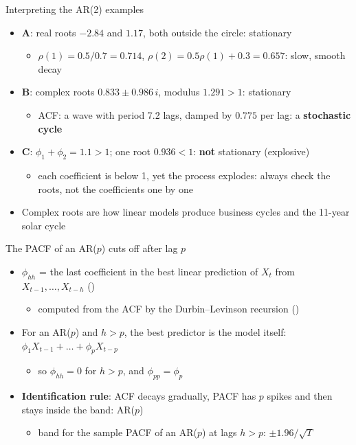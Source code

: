 \begin{frame}{Interpreting the AR(2) examples}
\itemsize{\small}
\begin{itemize}
    \item \textbf{A}: real roots $\ensuremath{-}2.84$ and $1.17$, both outside the circle: stationary
    \begin{itemize}
        \item $\rho(1) = 0.5/0.7 = 0.714$, $\rho(2) = 0.5\rho(1) + 0.3 = 0.657$: slow, smooth decay
    \end{itemize}
    \item \textbf{B}: complex roots $0.833 \pm 0.986\,i$, modulus $1.291 > 1$: stationary
    \begin{itemize}
        \item ACF: a wave with period 7.2 lags, damped by $0.775$ per lag: a \textbf{stochastic cycle}
    \end{itemize}
    \item \textbf{C}: $\phi_1 + \phi_2 = 1.1 > 1$; one root $0.936 < 1$: \textbf{not} stationary (explosive)
    \begin{itemize}
        \item each coefficient is below 1, yet the process explodes: always check the roots, not the coefficients one by one
    \end{itemize}
    \item Complex roots are how linear models produce business cycles and the 11-year solar cycle
\end{itemize}
\end{frame}

\begin{frame}{The PACF of an AR($p$) cuts off after lag $p$}
\itemsize{\small}
\begin{itemize}
    \item $\phi_{hh}$ = the last coefficient in the best linear prediction of $X_t$ from $X_{t-1}, \dots, X_{t-h}$ ()
    \begin{itemize}
        \item computed from the ACF by the Durbin--Levinson recursion ()
    \end{itemize}
    \item For an AR($p$) and $h > p$, the best predictor is the model itself: $\phi_1X_{t-1} + \dots + \phi_pX_{t-p}$
    \begin{itemize}
        \item so $\phi_{hh} = 0$ for $h > p$, and $\phi_{pp} = \phi_p$
    \end{itemize}
    \item \textbf{Identification rule}: ACF decays gradually, PACF has $p$ spikes and then stays inside the band: AR($p$)
    \begin{itemize}
        \item band for the sample PACF of an AR($p$) at lags $h > p$: $\pm 1.96/\sqrt{T}$
    \end{itemize}
\end{itemize}
\end{frame}

